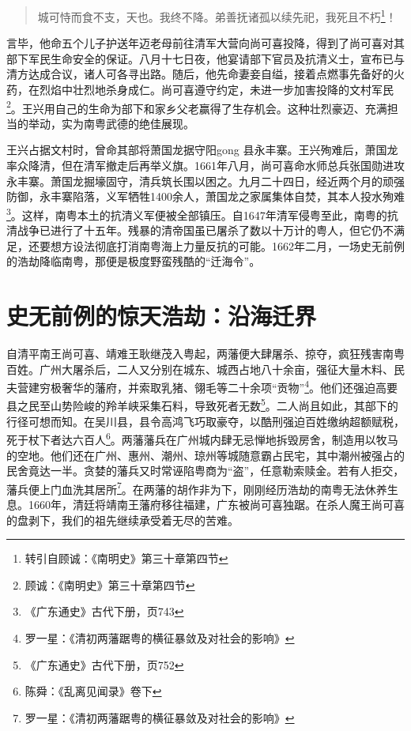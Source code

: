 \begin{quote}

城可恃而食不支，天也。我终不降。弟善抚诸孤以续先祀，我死且不朽\footnote{转引自顾诚：《南明史》第三十章第四节}！

\end{quote}

言毕，他命五个儿子护送年迈老母前往清军大营向尚可喜投降，得到了尚可喜对其部下军民生命安全的保证。八月十七日夜，他宴请部下官员及抗清义士，宣布已与清方达成合议，诸人可各寻出路。随后，他先命妻妾自缢，接着点燃事先备好的火药，在烈焰中壮烈地杀身成仁。尚可喜遵守约定，未进一步加害投降的文村军民\footnote{顾诚：《南明史》第三十章第四节}。王兴用自己的生命为部下和家乡父老赢得了生存机会。这种壮烈豪迈、充满担当的举动，实为南粤武德的绝佳展现。

王兴占据文村时，曾命其部将萧国龙据守阳gong 县永丰寨。王兴殉难后，萧国龙率众降清，但在清军撤走后再举义旗。1661年八月，尚可喜命水师总兵张国勋进攻永丰寨。萧国龙掘壕固守，清兵筑长围以困之。九月二十四日，经近两个月的顽强防御，永丰寨陷落，义军牺牲1400余人，萧国龙之家属集体自焚，其本人投水殉难\footnote{《广东通史》古代下册，页743}。这样，南粤本土的抗清义军便被全部镇压。自1647年清军侵粤至此，南粤的抗清战争已进行了十五年。残暴的清帝国虽已屠杀了数以十万计的粤人，但它仍不满足，还要想方设法彻底打消南粤海上力量反抗的可能。1662年二月，一场史无前例的浩劫降临南粤，那便是极度野蛮残酷的“迁海令”。


\section{史无前例的惊天浩劫：沿海迁界}

自清平南王尚可喜、靖难王耿继茂入粤起，两藩便大肆屠杀、掠夺，疯狂残害南粤百姓。广州大屠杀后，二人又分别在城东、城西占地八十余亩，强征大量木料、民夫营建穷极奢华的藩府，并索取乳猪、翎毛等二十余项“贡物”\footnote{罗一星：《清初两藩踞粤的横征暴敛及对社会的影响》 }。他们还强迫高要县之民至山势险峻的羚羊峡采集石料，导致死者无数\footnote{《广东通史》古代下册，页752}。二人尚且如此，其部下的行径可想而知。在吴川县，县令高鸿飞巧取豪夺，以酷刑强迫百姓缴纳超额赋税，死于杖下者达六百人\footnote{陈舜：《乱离见闻录》卷下}。两藩藩兵在广州城内肆无忌惮地拆毁房舍，制造用以牧马的空地。他们还在广州、惠州、潮州、琼州等城随意霸占民宅，其中潮州被强占的民舍竟达一半。贪婪的藩兵又时常诬陷粤商为“盗”，任意勒索赎金。若有人拒交，藩兵便上门血洗其居所\footnote{罗一星：《清初两藩踞粤的横征暴敛及对社会的影响》}。在两藩的胡作非为下，刚刚经历浩劫的南粤无法休养生息。1660年，清廷将靖南王藩府移往福建，广东被尚可喜独踞。在杀人魔王尚可喜的盘剥下，我们的祖先继续承受着无尽的苦难。

